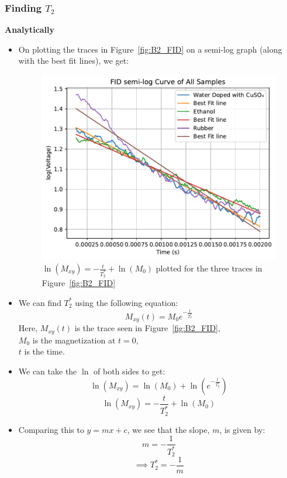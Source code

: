 \documentclass{article}
\begin{document}
\subsubsection{Finding $T_2$}
\textbf{Analytically}
\begin{itemize}
    \item On plotting the traces in Figure~\ref{fig:B2_FID} on a semi-log graph (along with the best fit lines), we get:
    \begin{figure}[h!]
        \centering
        \includegraphics[scale = 0.78]{./images/B2_log_best_fit}
        \caption{$\ln(M_{xy}) = -\frac{t}{T_2^*} + \ln(M_0)$ plotted for the three traces in Figure~\ref{fig:B2_FID}}
        \label{fig:B2_FID_log_best_fit}
    \end{figure}

    \item We can find $T_2^*$ using the following equation:
    \[ M_{xy}(t) = M_0 e^{-\frac{t}{T_2^*}} \]
    Here, $M_{xy}(t)$ is the trace seen in Figure~\ref{fig:B2_FID},\\
    $M_0$ is the magnetization at $t=0$,\\
    $t$ is the time.
    \item We can take the $\ln$ of both sides to get:
    \[ \ln(M_{xy}) = \ln(M_0) + \ln\left(e^{-\frac{t}{T_2^*}}\right) \]
    \[ \ln(M_{xy}) = -\frac{t}{T_2^*} + \ln(M_0) \]
    \item Comparing this to $y = mx + c$, we see that the slope, $m$, is given by:
    \[ m = -\frac{1}{T_2^*} \]
    \[ \implies T_2^* = -\frac{1}{m} \]
\end{itemize}
\end{document}
